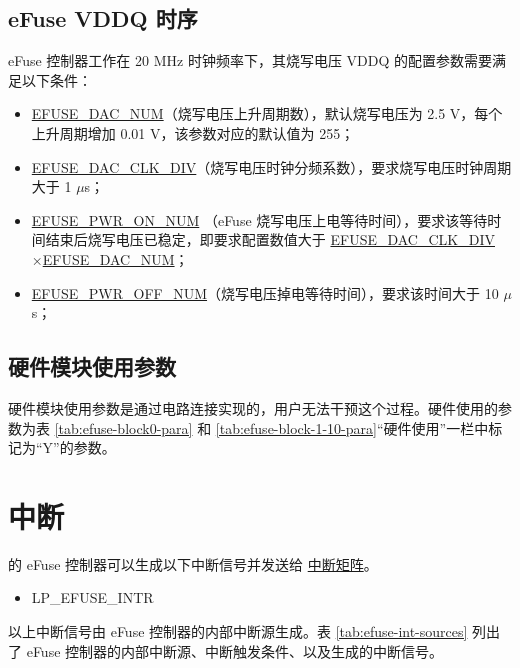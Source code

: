 \documentclass[main\_\_CN.tex]{subfiles}
\begin{document}
\subsection{eFuse VDDQ 时序}
\label{sec:efuse-vddq-timing}

eFuse 控制器工作在 20 MHz 时钟频率下，其烧写电压 VDDQ 的配置参数需要满足以下条件：
\begin{itemize}
    \item \hyperref[fielddesc:EFUSEDACNUM]{EFUSE\_DAC\_NUM}（烧写电压上升周期数），默认烧写电压为 2.5 V，每个上升周期增加 0.01 V，该参数对应的默认值为 255；
    \item \hyperref[fielddesc:EFUSEDACCLKDIV]{EFUSE\_DAC\_CLK\_DIV}（烧写电压时钟分频系数），要求烧写电压时钟周期大于 1 $\mu$s；
    \item \hyperref[fielddesc:EFUSEPWRONNUM]{EFUSE\_PWR\_ON\_NUM} （eFuse 烧写电压上电等待时间），要求该等待时间结束后烧写电压已稳定，即要求配置数值大于 \hyperref[fielddesc:EFUSEDACCLKDIV]{EFUSE\_DAC\_CLK\_DIV} ×\hyperref[fielddesc:EFUSEDACNUM]{EFUSE\_DAC\_NUM}；
    \item \hyperref[fielddesc:EFUSEPWROFFNUM]{EFUSE\_PWR\_OFF\_NUM}（烧写电压掉电等待时间），要求该时间大于 10 $\mu$s；
\end{itemize}




\subsection{硬件模块使用参数}

硬件模块使用参数是通过电路连接实现的，用户无法干预这个过程。硬件使用的参数为表 \ref{tab:efuse-block0-para} 和 \ref{tab:efuse-block-1-10-para}“硬件使用”一栏中标记为“Y”的参数。



\section{中断}


\chipname{} 的 eFuse 控制器可以生成以下中断信号并发送给 \hyperref[mod:intmtrx]{中断矩阵}。

    \begin{itemize}
        \item LP\_EFUSE\_INTR
    \end{itemize}

以上中断信号由 eFuse 控制器的内部中断源生成。表 \ref{tab:efuse-int-sources} 列出了 eFuse 控制器的内部中断源、中断触发条件、以及生成的中断信号。
\end{document}
